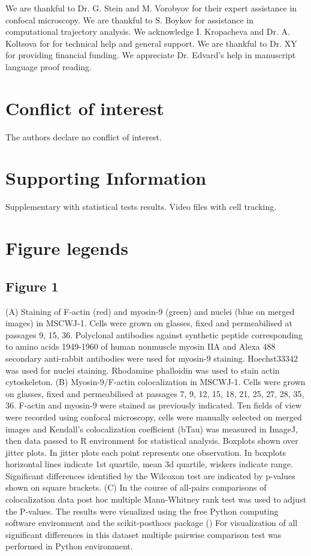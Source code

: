 \documentclass[alpha-refs]{wiley-article}
\begin{document}
We are thankful to Dr. G. Stein and M. Vorobyov for their expert assistance in confocal microscopy.
We are thankful to S. Boykov for assistance in computational trajectory analysis.
We acknowledge I. Kropacheva and Dr. A. Koltsova for for technical help and general support.
We are thankful to Dr. XY for providing financial funding.
We appreciate Dr. Edvard's help in manuscript language proof reading.

\section*{Conflict of interest}
The authors declare no conflict of interest.





\section*{Supporting Information}

Supplementary with statistical tests results.
Video files with cell tracking.

\section*{Figure legends}

\subsection*{Figure 1}
(A) Staining of F-actin (red) and myosin-9 (green) and nuclei (blue on merged images) in MSCWJ-1.
Cells were grown on glasses, fixed and permeabilised at passages 9, 15, 36.
Polyclonal antibodies against synthetic peptide corresponding to amino acids 1949-1960 of human nonmuscle myosin IIA and Alexa 488 secondary anti-rabbit antibodies were used for myosin-9 staining.
Hoechst33342 was used for nuclei staining.
Rhodamine phalloidin was used to stain actin cytoskeleton.
(B) Myosin-9/F-actin colocalization in MSCWJ-1.
Cells were grown on glasses, fixed and permeabilised at passages 7, 9, 12, 15, 18, 21, 25, 27, 28, 35, 36.
F-actin and myosin-9 were stained as previously indicated.
Ten fields of view were recorded using confocal microscopy, cells were manually selected on merged images and Kendall's colocalization coefficient (bTau) was measured in ImageJ, then data passed to R environment for statistical analysis.
Boxplots shown over jitter plots.
In jitter plots each point represents one observation.
In boxplots horizontal lines indicate 1st quartile, mean 3d quartile, wiskers indicate range.
Significant differences identified by the Wilcoxon test are indicated by p-values shown on square brackets.
(C) In the course of all-pairs comparisons of colocalization data post hoc multiple Mann-Whitney rank test was used to adjust the P-values.
The results were visualized using the free Python computing software environment and the scikit-posthocs package (\cite{Terpilowski2019})
For visualization of all significant differences in this dataset multiple pairwise comparison test was performed in Python environment.
\end{document}
